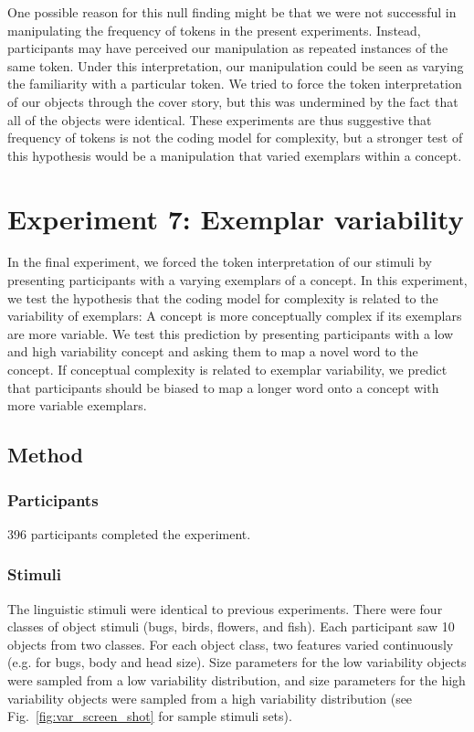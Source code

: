 One possible reason for this null finding might be that we were not successful in manipulating the frequency of tokens in the present experiments. Instead, participants may have perceived our manipulation as repeated instances of the same token. Under this interpretation, our manipulation could be seen as varying the familiarity with a particular token. We tried to force the token interpretation of our objects through the cover story, but this was undermined by the fact that all of the objects were identical. These experiments are thus  suggestive that frequency of tokens is not the coding model for complexity, but a stronger test of this hypothesis would be a manipulation that varied exemplars within a concept. 

\section{Experiment 7: Exemplar variability}
In the final experiment, we forced the token interpretation of our stimuli by presenting participants with a varying exemplars of a concept. In this experiment, we test the hypothesis that the coding model for complexity is related to the variability of exemplars:  A concept is more conceptually complex if its exemplars are more variable. We test this prediction by presenting participants with a low and high variability concept and asking them to map a novel word to the concept. If conceptual complexity is related to exemplar variability, we predict that participants should be biased to map a longer word onto a concept with more variable exemplars.

\subsection{Method}
\subsubsection{Participants}
396 participants completed the experiment.
\subsubsection{Stimuli}
The linguistic stimuli were identical to previous experiments. There were four classes of object stimuli (bugs, birds, flowers, and fish). Each participant saw 10 objects from two classes. For each object class, two features varied continuously (e.g. for bugs, body and head size). Size parameters for the low variability objects were  sampled from a low variability distribution, and size parameters for the high variability objects were  sampled from a high variability distribution (see Fig.\ \ref{fig:var_screen_shot} for sample stimuli sets).
